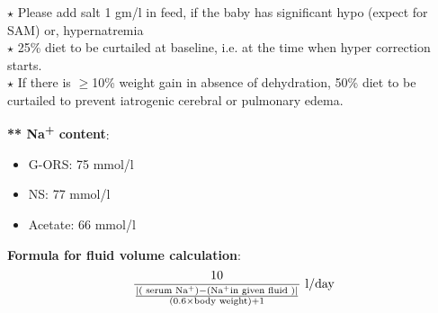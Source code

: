 \documentclass[11pt,a4paper]{report}
\begin{document}
\begin{enumerate}
	{\color{red}$\star$} Please add salt 1 gm/l in feed, if the baby has significant hypo (expect for SAM) or, hypernatremia \\
	{\color{red}$\star$} 25\% diet to be curtailed at baseline, i.e. at the time when hyper correction starts. \\
	{\color{red}$\star$} If there is $\geq$10\% weight gain in absence of dehydration, 50\% diet to be curtailed to prevent iatrogenic cerebral or pulmonary edema. 
	
	\textbf{** Na\textsuperscript{+} content}: 
	\begin{itemize}[noitemsep]
		\item G-ORS: 75 mmol/l
		\item {} NS: 77 mmol/l
		\item {} Acetate: 66 mmol/l \\
	\end{itemize}
	
	\textbf{Formula for fluid volume calculation}: 
	\begin{equation}
	\frac
	{10}
	{\frac
		{| (\text{ serum } \ce{Na+}) - (\ce{Na+} \text{in given fluid }) |}
		{(0.6 \times \text{body weight}) + 1}
	} \text{ l/day}
	\end{equation}
\end{enumerate}


\newpage
\end{document}
